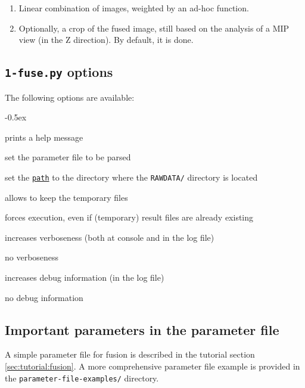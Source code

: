 \begin{enumerate}
\item \label{it:fusion:combination}  Linear combination of images, weighted by an ad-hoc function.

\item  \label{it:fusion:crop:2} Optionally, a crop of the fused image, still based on the analysis of a MIP view (in the Z direction). By default, it is done.
\end{enumerate}




\subsection{\texttt{1-fuse.py} options}

The following options are available:
\begin{description}
  \itemsep -0.5ex
\item[\texttt{-h}] prints a help message
\item[\texttt{-p \underline{file}}] set the parameter file to be parsed
\item[\texttt{-e \underline{path}}] set the
  \texttt{\underline{path}} to the directory where the
  \texttt{RAWDATA/} directory is located
\item[\texttt{-k}] allows to keep the temporary files
\item[\texttt{-f}] forces execution, even if (temporary) result files
  are already existing
\item[\texttt{-v}] increases verboseness (both at console and in the
  log file)
\item[\texttt{-nv}] no verboseness
\item[\texttt{-d}]  increases debug information (in the
  log file)
\item[\texttt{-nd}] no debug information
\end{description}


\subsection{Important parameters in the parameter file}
\label{sec:cli:fuse:important:parameters}

A simple parameter file for fusion is described in the tutorial
section \ref{sec:tutorial:fusion}. A more comprehensive parameter file
example is provided in the \texttt{parameter-file-examples/} directory.

